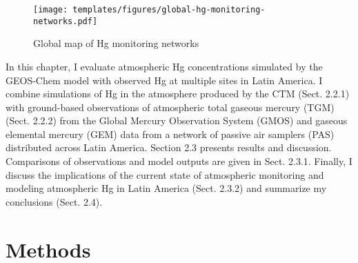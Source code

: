 \begin{figure}[H]
  \texttt{[image: templates/figures/global-hg-monitoring-networks.pdf]}
  \caption{Global map of Hg monitoring networks \cite{united_nations_environment_programme_technical_2019}}
  \label{fig:global-hg-monitoring-networks}
  \centering
  
\end{figure}
\FloatBarrier

\begin{flushleft}
 In this chapter, I evaluate atmospheric Hg concentrations simulated by the GEOS-Chem model with observed Hg at multiple sites in Latin America. I combine simulations of Hg in the atmosphere produced by the \gc CTM (Sect. 2.2.1) with ground-based observations of atmospheric total gaseous mercury (TGM) (Sect. 2.2.2) from the Global Mercury Observation System (GMOS)\cite{sprovieri_atmospheric_2016} and gaseous elemental mercury (GEM) data from a network of passive air samplers (PAS) distributed across Latin America. Section 2.3 presents results and discussion\cite{quant_measuring_2021}. Comparisons of observations and model outputs are given in Sect. 2.3.1. Finally, I discuss the implications of the current state of atmospheric monitoring and modeling atmospheric Hg in Latin America (Sect. 2.3.2) and summarize my conclusions (Sect. 2.4).
\end{flushleft}




\section{Methods}

